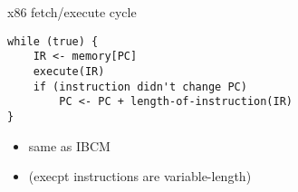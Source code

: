 \begin{frame}{x86 fetch/execute cycle}
\begin{lstlisting}
while (true) {
    IR <- memory[PC]
    execute(IR)
    if (instruction didn't change PC)
        PC <- PC + length-of-instruction(IR)
}
\end{lstlisting}
\begin{itemize}
\item same as IBCM 
\item (execpt instructions are variable-length)
\end{itemize}
\end{frame}
